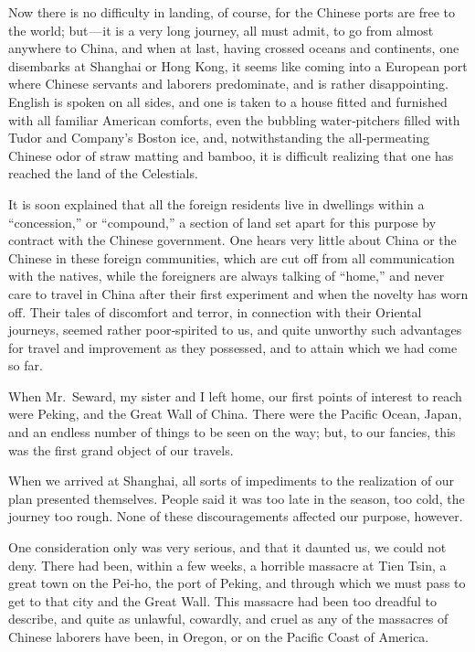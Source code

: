 \documentclass[12pt]{book}
\begin{document}
Now there is no difficulty in landing, of course, for the Chinese ports are free
to the world; but — it is a very long journey, all must admit, to go from almost
anywhere to China, and when at last, having crossed oceans and continents, one
disembarks at Shanghai or Hong Kong, it seems like coming into a European port
where Chinese servants and laborers predominate, and is rather disappointing.
English is spoken on all sides, and one is taken to a house fitted and furnished with
all familiar American comforts, even the bubbling water‐pitchers filled with Tudor
and Company’s Boston ice, and, notwithstanding the all‐permeating Chinese odor
of straw matting and bamboo, it is difficult realizing that one has reached the land
of the Celestials.

It is soon explained that all the foreign residents live in dwellings within
a “concession,” or “compound,” a section of land set apart for this purpose by
contract with the Chinese government. One hears very little about China or the
Chinese in these foreign communities, which are cut off from all communication
with the natives, while the foreigners are always talking of “home,” and never care
to travel in China after their first experiment and when the novelty has worn off.
Their tales of discomfort and terror, in connection with their Oriental journeys,
seemed rather poor‐spirited to us, and quite unworthy such advantages for travel
and improvement as they possessed, and to attain which we had come so far.

When Mr.~Seward, my sister and I left home, our first points of interest to
reach were Peking, and the Great Wall of China. There were the Pacific Ocean,
Japan, and an endless number of things to be seen on the way; but, to our fancies,
this was the first grand object of our travels.

When we arrived at Shanghai, all sorts of impediments to the realization of
our plan presented themselves. People said it was too late in the season, too
cold, the journey too rough. None of these discouragements affected our purpose,
however.

One consideration only was very serious, and that it daunted us, we could not
deny. There had been, within a few weeks, a horrible massacre at Tien Tsin, a
great town on the Pei‐ho, the port of Peking, and through which we must pass
to get to that city and the Great Wall. This massacre had been too dreadful to
describe, and quite as unlawful, cowardly, and cruel as any of the massacres of
Chinese laborers have been, in Oregon, or on the Pacific Coast of America.
\end{document}
